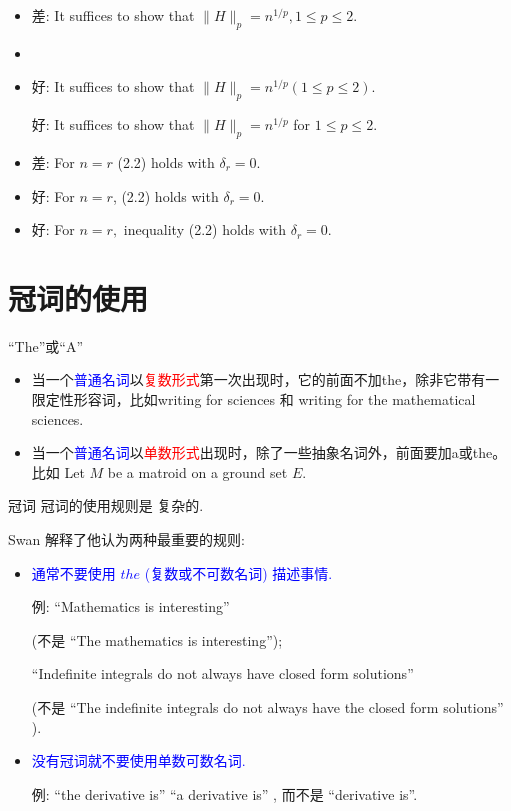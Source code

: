 \documentclass{ctexbeamer}
\newcommand{\red}[1]{\textcolor{red}{#1}}
\newcommand{\blue}[1]{\textcolor{blue}{#1}}
\begin{document}
\begin{frame}
	\begin{itemize}
	\item
差: It suffices to show that $\|H\|_{p}=n^{1 / p}, 1 \leqslant p \leqslant 2$. \pause
	\item

\item
好: It suffices to show that $\|H\|_{p}=n^{1 / p}(1 \leqslant p \leqslant 2)$.

好: It suffices to show that $\|H\|_{p}=n^{1 / p}$ for $1 \leqslant p \leqslant 2$.
	\end{itemize}
\vspace{10pt}

\begin{itemize}
	\item
差: For $n=r$  (2.2) holds with $\delta_{r}=0$. \pause
\item
好: For $n=r$, (2.2) holds with $\delta_{r}=0 .$
\item
好: For $n=r,$ inequality (2.2) holds with $\delta_{r}=0$.
	\end{itemize}

\end{frame}
\section{{冠词}的使用}
\begin{frame}{``The''或``A''}

    \begin{itemize}
        \item  当一个\blue{普通名词}以\red{复数形式}第一次出现时，它的前面不加the，除非它带有一限定性形容词，比如writing for sciences 和 writing for the mathematical sciences.
        \item 当一个\blue{普通名词}以\red{单数形式}出现时，除了一些抽象名词外，前面要加a或the。
        比如   Let $M$ be a matroid on a ground set $E$.

    \end{itemize}
\end{frame}


\begin{frame}{冠词}
冠词的使用规则是 复杂的.


{Swan} 解释了他认为两种最重要的规则:

\begin{itemize}
    \item \blue{通常不要使用 $t h e$ (复数或不可数名词) 描述事情. }

    例: ``Mathematics is interesting''

    (不是 ``The mathematics is interesting'');

    ``Indefinite integrals do not always have closed form solutions''

    (不是 ``The indefinite integrals do not always have the closed form solutions'' ).

    \item \blue{没有冠词就不要使用单数可数名词.}

    例: ``the derivative is'' ``a derivative is'' , 而不是 ``derivative is''.
\end{itemize}
\end{frame}
\end{document}
